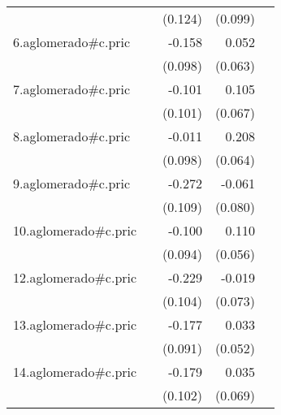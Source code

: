 {\begin{longtable}{l*{4}{D{.}{.}{-1}}}
            &                     &     (0.124)         &     (0.099)         &                     \\
\addlinespace
6.aglomerado#c.pric&                     &      -0.158         &       0.052         &                     \\
            &                     &     (0.098)         &     (0.063)         &                     \\
\addlinespace
7.aglomerado#c.pric&                     &      -0.101         &       0.105         &                     \\
            &                     &     (0.101)         &     (0.067)         &                     \\
\addlinespace
8.aglomerado#c.pric&                     &      -0.011         &       0.208\sym{**} &                     \\
            &                     &     (0.098)         &     (0.064)         &                     \\
\addlinespace
9.aglomerado#c.pric&                     &      -0.272\sym{*}  &      -0.061         &                     \\
            &                     &     (0.109)         &     (0.080)         &                     \\
\addlinespace
10.aglomerado#c.pric&                     &      -0.100         &       0.110         &                     \\
            &                     &     (0.094)         &     (0.056)         &                     \\
\addlinespace
12.aglomerado#c.pric&                     &      -0.229\sym{*}  &      -0.019         &                     \\
            &                     &     (0.104)         &     (0.073)         &                     \\
\addlinespace
13.aglomerado#c.pric&                     &      -0.177         &       0.033         &                     \\
            &                     &     (0.091)         &     (0.052)         &                     \\
\addlinespace
14.aglomerado#c.pric&                     &      -0.179         &       0.035         &                     \\
            &                     &     (0.102)         &     (0.069)         &                     \\

\end{longtable}}
